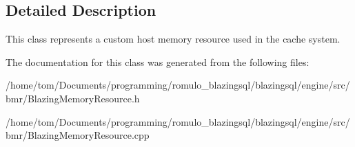 \subsection{Detailed Description}
This class represents a custom host memory resource used in the cache system. 

The documentation for this class was generated from the following files\+:\begin{DoxyCompactItemize}
\item 
/home/tom/\+Documents/programming/romulo\+\_\+blazingsql/blazingsql/engine/src/bmr/Blazing\+Memory\+Resource.\+h\item 
/home/tom/\+Documents/programming/romulo\+\_\+blazingsql/blazingsql/engine/src/bmr/Blazing\+Memory\+Resource.\+cpp\end{DoxyCompactItemize}
